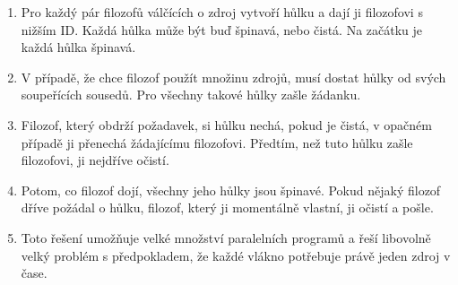 \documentclass{article}
\begin{document}
\begin{enumerate}
	\item Pro každý pár filozofů válčících o zdroj vytvoří hůlku a dají ji filozofovi s nižším ID. Každá hůlka může být buď špinavá, nebo čistá. Na začátku je každá hůlka špinavá.
	\item V případě, že chce filozof použít množinu zdrojů, musí dostat hůlky od svých soupeřících sousedů. Pro všechny takové hůlky zašle žádanku.
	\item Filozof, který obdrží požadavek, si hůlku nechá, pokud je čistá, v opačném případě ji přenechá žádajícímu filozofovi. Předtím, než tuto hůlku zašle filozofovi, ji nejdříve očistí.
	\item Potom, co filozof dojí, všechny jeho hůlky jsou špinavé. Pokud nějaký filozof dříve požádal o hůlku, filozof, který ji momentálně vlastní, ji očistí a pošle.
	\item Toto řešení umožňuje velké množství paralelních programů a řeší libovolně velký problém s předpokladem, že každé vlákno potřebuje právě jeden zdroj v čase.
\end{enumerate}
\end{document}
